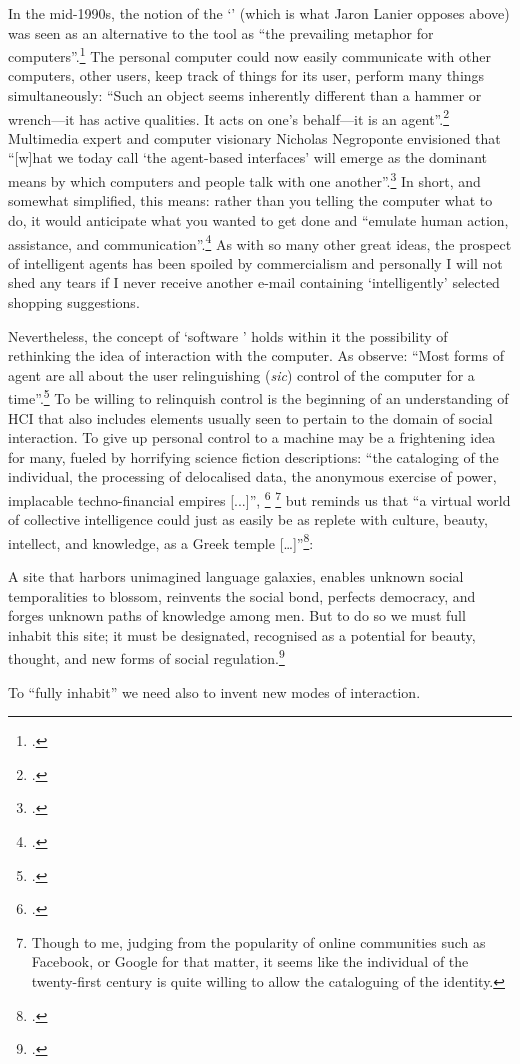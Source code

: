\label{sec:inter-defin:par5}
In the mid-1990s, the notion of the `' (which is what Jaron Lanier opposes above) was seen as an alternative to the tool as ``the prevailing metaphor for computers''.\footcite[67]{isbister95} The personal computer could now easily communicate with other computers, other users, keep track of things for its user, perform many things simultaneously: ``Such an object seems inherently different than a hammer or wrench---it has active qualities. It acts on one's behalf---it is an agent''.\footcite[p. 68]{isbister95} Multimedia expert and computer visionary Nicholas Negroponte envisioned that ``[w]hat we today call `the agent-based interfaces' will emerge as the dominant means by which computers and people talk with one another''.\footcite[p. 102]{negroponte95}  In short, and somewhat simplified, this means: rather than you telling the computer what to do, it would anticipate what you wanted to get done and ``emulate human action, assistance, and communication''.\footcite[83]{isbister95} As with so many other great ideas, the prospect of intelligent agents has been spoiled by commercialism and personally I will not shed any tears if I never receive another e-mail containing `intelligently' selected shopping suggestions.

\label{sec:inter-defin:par6}
\hypertarget{sec:target:inter-defin:par6}{Nevertheless}, the concept of `software ' holds within it the possibility of rethinking the idea of interaction with the computer. As \citeauthor{isbister95} observe: ``Most forms of agent are all about the user relinguishing (\emph{sic}) control of the computer for a time''.\footcite{isbister95} To be willing to relinquish control is the beginning of an understanding of HCI that also includes elements usually seen to pertain to the domain of social interaction. To give up personal control to a machine may be a frightening idea for many, fueled by horrifying science fiction descriptions: ``the cataloging of the individual, the processing of delocalised data, the anonymous exercise of power, implacable techno-financial empires [...]'',
\footcite[p. 117]{levy97} \footnote{Though to me, judging from the popularity of online communities such as Facebook, or Google for that matter, it seems like the individual of the twenty-first century is quite willing to allow the cataloguing of the identity.} but \citeauthor{levy97} reminds us that ``a virtual world of collective intelligence could just as easily be as replete with culture, beauty, intellect, and knowledge, as a Greek temple [\ldots]''\footcite[118]{levy97}:
\begin{squote}
A site that harbors unimagined language galaxies, enables unknown social temporalities to blossom, reinvents the social bond, perfects democracy, and forges unknown paths of knowledge among men. But to do so we must full inhabit this site; it must be designated, recognised as a potential for beauty, thought, and new forms of social regulation.\footcite[118]{levy97}
\end{squote}
To ``fully inhabit'' we need also to invent new modes of interaction.

